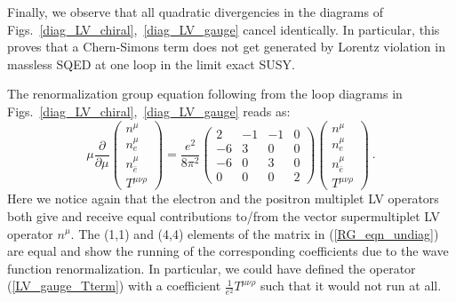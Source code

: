 \documentclass[paper,12pt]{revtex4}
\begin{document}

	Finally, we observe that all quadratic divergencies in the
	diagrams of Figs.~\ref{diag_LV_chiral},~\ref{diag_LV_gauge}
	cancel identically. In particular, this proves that a Chern-Simons term does not
	get generated by Lorentz violation in massless SQED at one loop in the  limit
	exact SUSY.


	
	The renormalization group equation following from the loop diagrams 
	in Figs.~\ref{diag_LV_chiral},~\ref{diag_LV_gauge}
	reads as:
\begin{equation}
\label{RG_eqn_undiag}
     \mu \frac{\partial}
              {\partial\mu} 
                \left(
		\begin{array}{c}
                   n^\mu \\ 
		   n_e^\mu \\
                   n_{\bar{e}}^\mu \\
		   T^{\mu\nu\rho}
                \end{array} \right) = 
     \frac{e^2}
          {8 \pi^2} 
     \left(\begin{array}{rrrr}
                    2 & -1 & -1 & 0 \\
		   -6 &  3 &  0 & 0 \\
                   -6 &  0 &  3 & 0 \\
		    0 &  0 &  0 & 2
           \end{array}\right)
     \left(
	  \begin{array}{c}
                 n^\mu \\ 
		 n_e^\mu \\
                 n_{\bar{e}}^\mu \\
		 T^{\mu\nu\rho}
          \end{array} \right)~.
\end{equation}
	Here we notice again that the electron and the positron
	multiplet LV operators both give and receive equal 
	contributions to/from the vector supermultiplet LV operator
	$ n^\mu $. 
	The (1,1) and (4,4) elements of the matrix 
	in (\ref{RG_eqn_undiag}) are equal and
	show the running of the corresponding coefficients due to
	the wave function renormalization. 
	In particular, we could have defined the operator
	(\ref{LV_gauge_Tterm}) with a coefficient 
	$ \frac{1}{e^2} T^{\mu\nu\rho} $
	such that it would not run at all.
\end{document}
